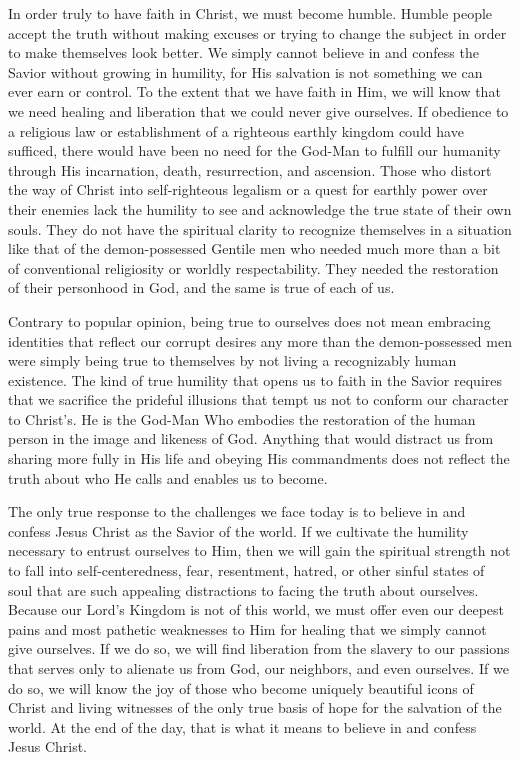 \documentclass[twoside, letterpaper, 12pt]{report}
\begin{document}
\begin{maybetwocolumns}
In order truly to have faith in Christ, we must become humble.  Humble people accept the truth
without making excuses or trying to change the subject in order to make themselves look better.  We
simply cannot believe in and confess the Savior without growing in humility, for His salvation is
not something we can ever earn or control.  To the extent that we have faith in Him, we will know
that we need healing and liberation that we could never give ourselves.  If obedience to a religious
law or establishment of a righteous earthly kingdom could have sufficed, there would have been no
need for the God-Man to fulfill our humanity through His incarnation, death, resurrection, and
ascension.  Those who distort the way of Christ into self-righteous legalism or a quest for earthly
power over their enemies lack the humility to see and acknowledge the true state of their own souls.
They do not have the spiritual clarity to recognize themselves in a situation like that of the
demon-possessed Gentile men who needed much more than a bit of conventional religiosity or worldly
respectability.  They needed the restoration of their personhood in God, and the same is true of
each of us.

Contrary to popular opinion, being true to ourselves does not mean embracing identities that reflect
our corrupt desires any more than the demon-possessed men were simply being true to themselves by
not living a recognizably human existence.  The kind of true humility that opens us to faith in the
Savior requires that we sacrifice the prideful illusions that tempt us not to conform our character
to Christ’s.  He is the God-Man Who embodies the restoration of the human person in the image and
likeness of God.  Anything that would distract us from sharing more fully in His life and obeying
His commandments does not reflect the truth about who He calls and enables us to become.

The only true response to the challenges we face today is to believe in and confess Jesus Christ as
the Savior of the world.  If we cultivate the humility necessary to entrust ourselves to Him, then
we will gain the spiritual strength not to fall into self-centeredness, fear, resentment, hatred, or
other sinful states of soul that are such appealing distractions to facing the truth about
ourselves.  Because our Lord’s Kingdom is not of this world, we must offer even our deepest pains
and most pathetic weaknesses to Him for healing that we simply cannot give ourselves.  If we do so,
we will find liberation from the slavery to our passions that serves only to alienate us from God,
our neighbors, and even ourselves.   If we do so, we will know the joy of those who become uniquely
beautiful icons of Christ and living witnesses of the only true basis of hope for the salvation of
the world.  At the end of the day, that is what it means to believe in and confess Jesus Christ.

\end{maybetwocolumns}
\end{document}
